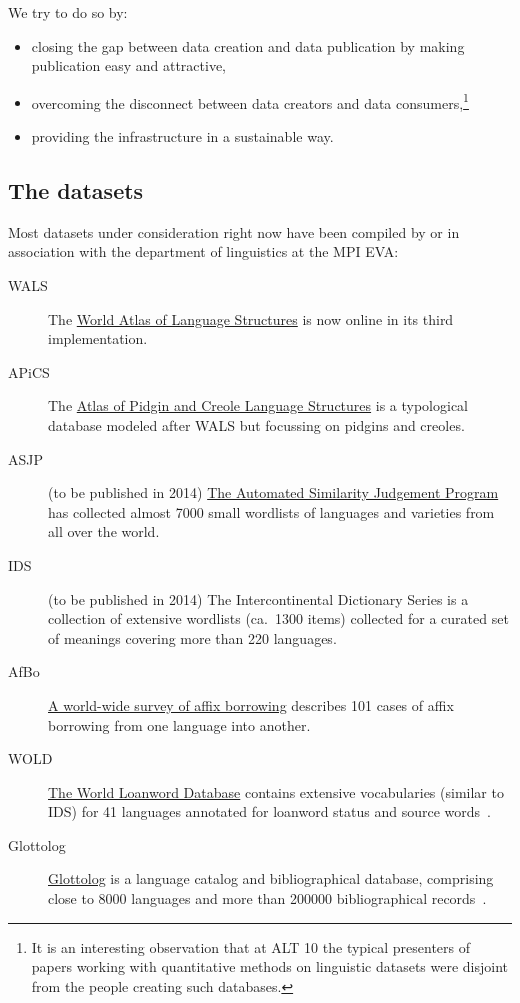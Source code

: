\documentclass[a4paper,10pt]{article}
\begin{document}
We try to do so by:
\begin{itemize}
\item closing the gap between data creation and data publication by making publication easy and attractive,
\item overcoming the disconnect between data creators and data consumers,\footnote{It is an
interesting observation that at ALT 10 the typical presenters of papers working with
quantitative methods on linguistic datasets were disjoint from the people creating such databases.}
\item providing the infrastructure in a sustainable way.
\end{itemize}

\subsection{The datasets}
Most datasets under consideration right now
have been compiled by or in association with the department of linguistics at the MPI EVA:
\begin{description}
\item[WALS] The \href{http://wals.info}{World Atlas of Language Structures} is now online in its third implementation.
\item[APiCS] The \href{http://apics-online.info}{Atlas of Pidgin and Creole Language Structures} is a typological database modeled after WALS but focussing on pidgins and creoles.
\item[ASJP] (to be published in 2014) \href{http://wwwstaff.eva.mpg.de/~wichmann/ASJPHomePage.htm}{The Automated Similarity Judgement Program} has collected almost 7000 small wordlists of languages and varieties from all over the world.
\item[IDS] (to be published in 2014) The Intercontinental Dictionary Series is a collection of extensive wordlists (ca.~1300 items)
collected for a curated set of meanings covering more than 220 languages.
\item[AfBo] \href{http://afbo.info/}{A world-wide survey of affix borrowing} describes 101 cases of affix borrowing from one language into another.
\item[WOLD] \href{http://wold.livingsources.org}{The World Loanword Database} contains extensive vocabularies (similar to IDS) for 41 languages annotated for loanword status and source words~\cite{tadmor2009}.
\item[Glottolog] \href{http://glottolog.org}{Glottolog} is a language catalog and bibliographical database, comprising close to 8000 languages and more than 200000 bibliographical records~\cite{nordhoff2012}.
\end{description}
\end{document}
